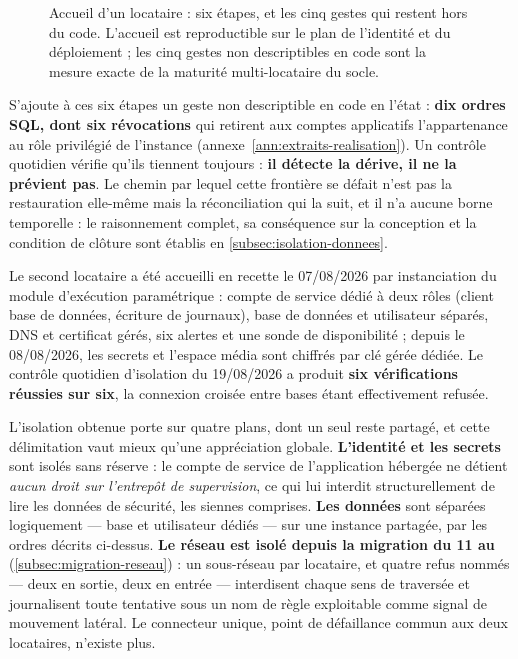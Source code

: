 \begin{figure}[htbp]
\begin{tikzpicture}
\end{tikzpicture}
\caption[Accueil d'un locataire : six étapes et cinq gestes hors du code]{Accueil d'un locataire :
six étapes, et les cinq gestes qui restent hors du code. L'accueil est reproductible sur le plan de
l'identité et du déploiement ; les cinq gestes non descriptibles en code sont la mesure exacte de la
maturité multi-locataire du socle.}
\label{fig:accueil-locataire}
\end{figure}

\begin{alertbox}[boxsep=1pt, left=4pt, right=4pt, top=3pt, bottom=3pt]
S'ajoute à ces six étapes un geste non descriptible en code en l'état : \textbf{dix ordres SQL,
dont six révocations} qui retirent aux comptes applicatifs l'appartenance au rôle privilégié de
l'instance (annexe~\ref{ann:extraits-realisation}). Un contrôle quotidien vérifie qu'ils tiennent
toujours : \textbf{il détecte la dérive, il ne la prévient pas}. Le chemin par lequel cette
frontière se défait n'est pas la restauration elle-même mais la réconciliation qui la suit, et il
n'a aucune borne temporelle : le raisonnement complet, sa conséquence sur la conception et la
condition de clôture sont établis en \cref{subsec:isolation-donnees}.
\end{alertbox}

Le second locataire a été accueilli en recette le 07/08/2026 par instanciation du module
d'exécution paramétrique : compte de service dédié à deux rôles (client base de données, écriture
de journaux), base de données et utilisateur séparés, DNS et certificat gérés, six alertes et une
sonde de disponibilité ; depuis le 08/08/2026, les secrets et l'espace média sont chiffrés par clé
gérée dédiée. Le contrôle quotidien d'isolation du 19/08/2026 a produit \textbf{six vérifications
réussies sur six}, la connexion croisée entre bases étant effectivement refusée.

L'isolation obtenue porte sur quatre plans, dont un seul reste partagé, et cette délimitation vaut
mieux qu'une appréciation globale. \textbf{L'identité et les secrets} sont isolés sans réserve : le
compte de service de l'application hébergée ne détient \emph{aucun droit sur l'entrepôt de
supervision}, ce qui lui interdit structurellement de lire les données de sécurité, les siennes
comprises. \textbf{Les données} sont séparées logiquement --- base et utilisateur dédiés --- sur une
instance partagée, par les ordres décrits ci-dessus. \textbf{Le réseau est isolé depuis la migration
du 11 au \dateref} (\cref{subsec:migration-reseau}) : un sous-réseau par locataire, et quatre refus
nommés --- deux en sortie, deux en entrée --- interdisent chaque sens de traversée et journalisent
toute tentative sous un nom de règle exploitable comme signal de mouvement latéral. Le connecteur
unique, point de défaillance commun aux deux locataires, n'existe plus.

